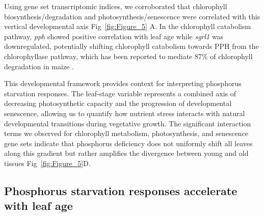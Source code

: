 \documentclass[9pt,twocolumn,twoside]{rilabRxiv}
\newcommand{\invfour}{\textit{Inv4m}\xspace}
\begin{document}
Using gene set transcriptomic indices, we corroborated that chlorophyll biosynthesis/degradation and photosynthesis/senescence were correlated with this vertical developmental axis Fig~\ref{fig:Figure_5} A.
In the chlorophyll catabolism pathway, \textit{pph} showed positive correlation with leaf age while \textit{sgrl1} was downregulated, potentially shifting chlorophyll catabolism towards PPH from the chlorophyllase pathway, which has been reported to mediate 87\% of chlorophyll degradation in maize \cite{wei2025}.


This developmental framework provides context for interpreting phosphorus starvation responses.
The leaf-stage variable represents a combined axis of decreasing photosynthetic capacity and the progression of developmental senescence, allowing us to quantify how nutrient stress interacts with natural developmental transitions during vegetative growth.
The significant interaction terms we observed for chlorophyll metabolism, photosynthesis, and senescence gene sets indicate that phosphorus deficiency does not uniformly shift all leaves along this gradient but rather amplifies the divergence between young and old tissues Fig~\ref{fig:Figure_5}D.

\subsection*{Phosphorus starvation responses accelerate with leaf age}
\end{document}
